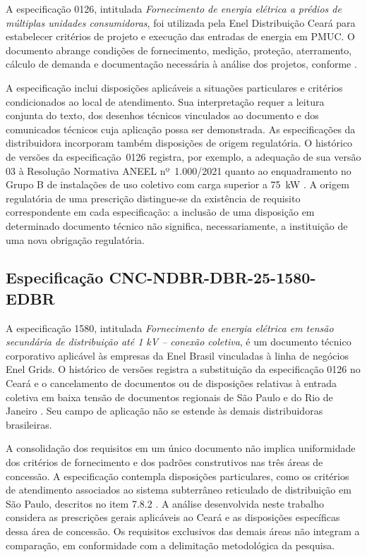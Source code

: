A especificação 0126, intitulada \emph{Fornecimento de energia elétrica a prédios de múltiplas unidades consumidoras}, foi utilizada pela Enel Distribuição Ceará para estabelecer critérios de projeto e execução das entradas de energia em PMUC. O documento abrange condições de fornecimento, medição, proteção, aterramento, cálculo de demanda e documentação necessária à análise dos projetos, conforme .

A especificação inclui disposições aplicáveis a situações particulares e critérios condicionados ao local de atendimento. Sua interpretação requer a leitura conjunta do texto, dos desenhos técnicos vinculados ao documento e dos comunicados técnicos cuja aplicação possa ser demonstrada. As especificações da distribuidora incorporam também disposições de origem regulatória. O histórico de versões da especificação~0126 registra, por exemplo, a adequação de sua versão 03 à Resolução Normativa ANEEL nº~1.000/2021 quanto ao enquadramento no Grupo B de instalações de uso coletivo com carga superior a 75~kW \cite[seção~2, p.~8, e item~7.2.1.5]{enel0126}. A origem regulatória de uma prescrição distingue-se da existência de requisito correspondente em cada especificação: a inclusão de uma disposição em determinado documento técnico não significa, necessariamente, a instituição de uma nova obrigação regulatória.

\subsection{Especificação CNC-NDBR-DBR-25-1580-EDBR}
\label{subsec:1580}

A especificação 1580, intitulada \emph{Fornecimento de energia elétrica em tensão secundária de distribuição até 1 kV -- conexão coletiva}, é um documento técnico corporativo aplicável às empresas da Enel Brasil vinculadas à linha de negócios Enel Grids. O histórico de versões registra a substituição da especificação 0126 no Ceará e o cancelamento de documentos ou de disposições relativas à entrada coletiva em baixa tensão de documentos regionais de São Paulo e do Rio de Janeiro \cite[itens~1 e~2]{enel1580}. Seu campo de aplicação não se estende às demais distribuidoras brasileiras.

A consolidação dos requisitos em um único documento não implica uniformidade dos critérios de fornecimento e dos padrões construtivos nas três áreas de concessão. A especificação contempla disposições particulares, como os critérios de atendimento associados ao sistema subterrâneo reticulado de distribuição em São Paulo, descritos no item 7.8.2 \cite[item~7.8.2]{enel1580}. A análise desenvolvida neste trabalho considera as prescrições gerais aplicáveis ao Ceará e as disposições específicas dessa área de concessão. Os requisitos exclusivos das demais áreas não integram a comparação, em conformidade com a delimitação metodológica da pesquisa.

